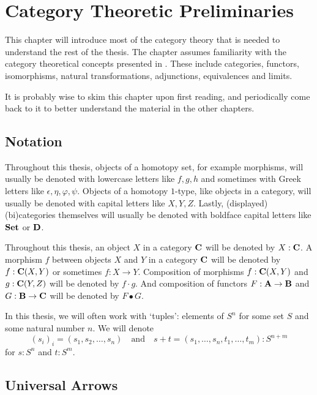 \chapter{Category Theoretic Preliminaries}\label{ch:category-theory}

This chapter will introduce most of the category theory that is needed to understand the rest of the thesis. The chapter assumes familiarity with the category theoretical concepts presented in \autocite{CT4P}. These include categories, functors, isomorphisms, natural transformations, adjunctions, equivalences and limits.

It is probably wise to skim this chapter upon first reading, and periodically come back to it to better understand the material in the other chapters.

\section{Notation}
Throughout this thesis, objects of a homotopy set, for example morphisms, will usually be denoted with lowercase letters like $ f, g, h $ and sometimes with Greek letters like $ \epsilon, \eta, \varphi, \psi $. Objects of a homotopy $ 1 $-type, like objects in a category, will usually be denoted with capital letters like $ X, Y, Z $. Lastly, (displayed) (bi)categories themselves will usually be denoted with boldface capital letters like $ \mathbf{Set} $ or $ \mathbf{D} $.

Throughout this thesis, an object $ X $ in a category $ \mathbf{C} $ will be denoted by $ X : \mathbf{C} $. A morphism $ f $ between objects $ X $ and $ Y $ in a category $ \mathbf{C} $ will be denoted by $ f: \mathbf{C}(X, Y) $ or sometimes $ f: X \to Y $. Composition of morphisms $ f: \mathbf{C}(X, Y) $ and $ g: \mathbf{C}(Y, Z) $ will be denoted by $ f \cdot g $. And composition of functors $ F: \mathbf{A} \to \mathbf{B} $ and $ G: \mathbf{B} \to \mathbf{C} $ will be denoted by $ F \bullet G $.

In this thesis, we will often work with `tuples': elements of $ S^n $ for some set $ S $ and some natural number $ n $. We will denote
\[ (s_i)_i = (s_1, s_2, \dots, s_n) \quad \text{and} \quad s + t = (s_1, \dots, s_n, t_1, \dots, t_m) : S^{n + m} \]
for $ s : S^n $ and $ t : S^m $.

\section{Universal Arrows}

